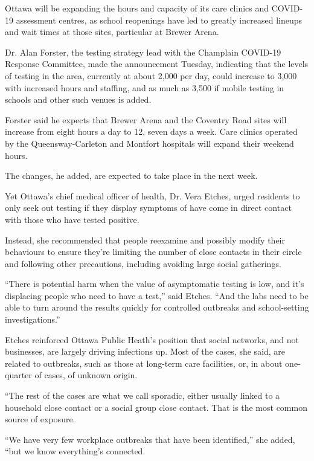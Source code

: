 \documentclass[]{article}
\newenvironment{Shaded}{\begin{snugshade}}{\end{snugshade}}
\newcommand{\StringTok}[1]{\textcolor[rgb]{0.31,0.60,0.02}{#1}}
\begin{document}
\begin{Shaded}
\begin{Highlighting}[]
\StringTok{Ottawa will be expanding the hours and capacity of its care clinics and COVID-19 assessment centres, as school reopenings have led to greatly increased lineups and wait times at those sites, particular at Brewer Arena.}

\StringTok{Dr. Alan Forster, the testing strategy lead with the Champlain COVID-19 Response Committee, made the announcement Tuesday, indicating that the levels of testing in the area, currently at about 2,000 per day, could increase to 3,000 with increased hours and staffing, and as much as 3,500 if mobile testing in schools and other such venues is added.}


\StringTok{Forster said he expects that Brewer Arena and the Coventry Road sites will increase from eight hours a day to 12, seven days a week. Care clinics operated by the Queensway-Carleton and Montfort hospitals will expand their weekend hours.}

\StringTok{The changes, he added, are expected to take place in the next week.}

\StringTok{Yet Ottawa’s chief medical officer of health, Dr. Vera Etches, urged residents to only seek out testing if they display symptoms of have come in direct contact with those who have tested positive.}

\StringTok{Instead, she recommended that people reexamine and possibly modify their behaviours to ensure they’re limiting the number of close contacts in their circle and following other precautions, including avoiding large social gatherings.}

\StringTok{“There is potential harm when the value of asymptomatic testing is low, and it’s displacing people who need to have a test,” said Etches. “And the labs need to be able to turn around the results quickly for controlled outbreaks and school-setting investigations.”}

\StringTok{Etches reinforced Ottawa Public Heath’s position that social networks, and not businesses, are largely driving infections up. Most of the cases, she said, are related to outbreaks, such as those at long-term care facilities, or, in about one-quarter of cases, of unknown origin.}

\StringTok{“The rest of the cases are what we call sporadic, either usually linked to a household close contact or a social group close contact. That is the most common source of exposure.}

\StringTok{“We have very few workplace outbreaks that have been identified,” she added, “but we know everything’s connected.}


\end{Highlighting}
\end{Shaded}
\end{document}
